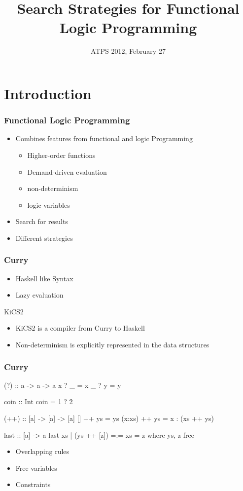\documentclass[
,hyperref={pdfpagelabels=false}
]{beamer}
\title[Search Strategies for FLP]
{Search Strategies for Functional Logic Programming}
\date[ATPS 2012]{ATPS 2012, February 27}
\author[Hanus, Peemöller, \underline{Reck}]{%
\texorpdfstring
  {Michael Hanus \and Björn Peemöller \and \underline{Fabian Reck}}
  {Michael Hanus \and Björn Peemöller \and Fabian Reck}
}
\institute{Kiel University}
\begin{document}
\begin{frame}%
\titlepage
\end{frame}


\section{Introduction}

\begin{frame}[fragile]%
\frametitle{Functional Logic Programming}
\begin{itemize}
\item Combines features from functional and logic Programming
  \begin{itemize}
   \item Higher-order functions
   \item Demand-driven evaluation
   \item non-determinism
   \item logic variables
  \end{itemize}
\item Search for results
\item Different strategies
\end{itemize}
\end{frame}

\begin{frame}[fragile]%
\frametitle{Curry}
\begin{itemize}
\item Haskell like Syntax
\item Lazy evaluation
\end{itemize}
\begin{block}{KiCS2}
\begin{itemize}
\item KiCS2 is a compiler from Curry to Haskell
\item Non-determinism is explicitly represented in
      the data structures
\end{itemize}
\end{block}
\end{frame}

\begin{frame}[fragile]%
\frametitle{Curry}
\begin{curry}%
(?) :: a -> a -> a
x ? _ = x
_ ? y = y

coin :: Int
coin = 1 ? 2

(++) :: [a] -> [a] -> [a]
[] ++ ys = ys
(x:xs) ++ ys = x : (xs ++ ys)

last :: [a] -> a
last xs | (ys ++ [z]) =:= xs = z
  where ys, z free
\end{curry}
\begin{itemize}
\item Overlapping rules
\item Free variables
\item Constraints
\end{itemize}
\end{frame}
\end{document}

